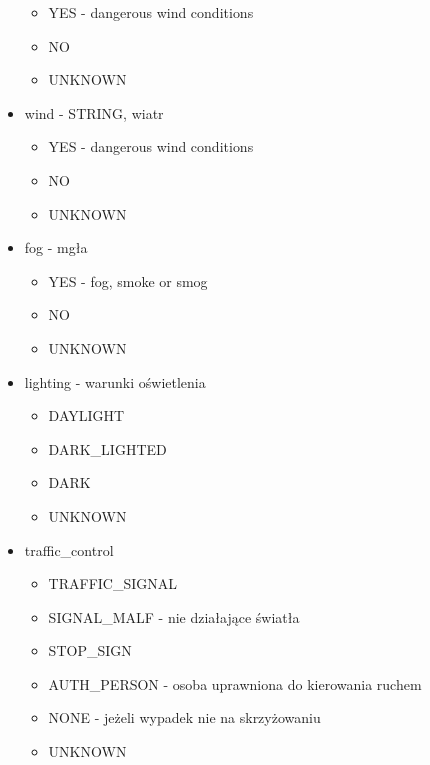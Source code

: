 \begin{itemize}
  \begin{itemize}
  \itemsep1pt\parskip0pt
  \item
    YES - dangerous wind conditions\\
  \item
    NO\\
  \item
    UNKNOWN\\
  \end{itemize}
\item
  wind - STRING, wiatr

  \begin{itemize}
  \itemsep1pt\parskip0pt
  \item
    YES - dangerous wind conditions\\
  \item
    NO\\
  \item
    UNKNOWN\\
  \end{itemize}
\item
  fog - mgła

  \begin{itemize}
  \itemsep1pt\parskip0pt
  \item
    YES - fog, smoke or smog\\
  \item
    NO\\
  \item
    UNKNOWN\\
  \end{itemize}
\item
  lighting - warunki oświetlenia

  \begin{itemize}
  \itemsep1pt\parskip0pt
  \item
    DAYLIGHT\\
  \item
    DARK\_LIGHTED\\
  \item
    DARK\\
  \item
    UNKNOWN\\
  \end{itemize}
\item
  traffic\_control

  \begin{itemize}
  \itemsep1pt\parskip0pt
  \item
    TRAFFIC\_SIGNAL\\
  \item
    SIGNAL\_MALF - nie działające światła\\
  \item
    STOP\_SIGN\\
  \item
    AUTH\_PERSON - osoba uprawniona do kierowania ruchem\\
  \item
    NONE - jeżeli wypadek nie na skrzyżowaniu\\
  \item
    UNKNOWN
  \end{itemize}
\end{itemize}

